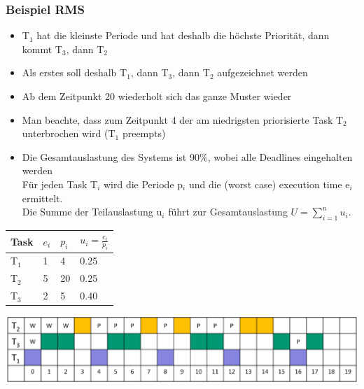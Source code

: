 \subsubsection{Beispiel RMS}
\begin{itemize}[noitemsep,topsep=0pt]
  \item T$_1$ hat die kleinste Periode und hat deshalb die höchste Priorität, dann kommt T$_3$, dann T$_2$
  \item Als erstes soll deshalb T$_1$, dann T$_3$, dann T$_2$ aufgezeichnet werden
  \item Ab dem Zeitpunkt 20 wiederholt sich das ganze Muster wieder
  \item Man beachte, dass zum Zeitpunkt 4 der am niedrigsten priorisierte Task T$_2$ unterbrochen wird (T$_1$ preempts)
  \item Die Gesamtauslastung des Systems ist 90\%, wobei alle Deadlines eingehalten werden\\Für jeden Task T$_i$ wird die Periode p$_i$ und die (worst case) execution time e$_i$ ermittelt.\\Die Summe der Teilauslastung u$_i$ führt zur Gesamtauslastung $U=\sum_{i = 1}^{n}   u_i$.
\end{itemize}
\begin{minipage}[t]{0.3\linewidth}
  \begin{tabular}{| l | l | l | l |}
    \hline
    Task  & $e_i$ & $p_i$ & $u_i=\frac{e_i}{p_i}$ \\
    \hline
    T$_1$ & 1     & 4     & 0.25                  \\
    \hline
    T$_2$ & 5     & 20    & 0.25                  \\
    \hline
    T$_3$ & 2     & 5     & 0.40                  \\
    \hline
  \end{tabular}
\end{minipage}
\begin{minipage}[c]{0.7\linewidth}
  \includegraphics[width=\linewidth]{images/Schedule/RMS}
\end{minipage}

